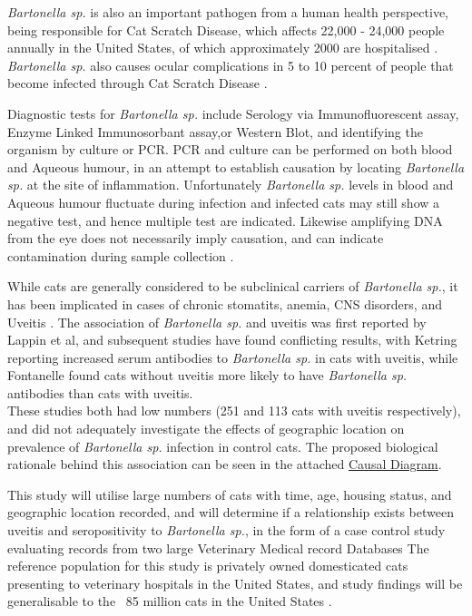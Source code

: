 \documentclass[11pt,twocolumn]{article}
\begin{document}
		\emph{Bartonella sp.} is also an important pathogen from a human health perspective, being responsible for Cat Scratch Disease, which affects 22,000 - 24,000 people annually in the United States, of which approximately 2000 are hospitalised \cite{Jackson1993}.
		\emph{Bartonella sp.} also causes ocular complications in 5 to 10 percent of people that become infected through Cat Scratch Disease \cite{Wade2000}.
	
		Diagnostic tests for \emph{Bartonella sp.} include Serology via Immunofluorescent assay, Enzyme Linked Immunosorbant assay,or Western Blot, and identifying the organism by culture or PCR.
		PCR and culture can be performed on both blood and Aqueous humour, in an attempt to establish causation by locating \emph{Bartonella sp.} at the site of inflammation. Unfortunately \emph{Bartonella sp.} levels in blood and Aqueous humour fluctuate during infection and infected cats may still show a negative test, and hence multiple test are indicated\cite{Guptill2010}. Likewise amplifying DNA from the eye does not necessarily imply causation, and can indicate contamination during sample collection \cite{Powell2010}.


		While cats are generally considered to be subclinical carriers of \emph{Bartonella sp.}, it has been implicated in cases of chronic stomatits, anemia, CNS disorders, and Uveitis \cite{Nasir2005}.
		The association of \emph{Bartonella sp.} and uveitis was first reported by Lappin et al\cite{Lappin1999}, and subsequent studies have found conflicting results, with Ketring reporting increased serum antibodies to \emph{Bartonella sp.} in cats with uveitis\cite{Ketring2004}, while Fontanelle found cats without uveitis more likely to have \emph{Bartonella sp.} antibodies than cats with uveitis.\\
		These studies both had low numbers (251 and 113 cats with uveitis respectively), and did not adequately investigate the effects of geographic location on prevalence of \emph{Bartonella sp.} infection in control cats.
		The proposed biological rationale behind this association can be seen in the attached \hyperref[fig:1]{Causal Diagram}.
	
		This study will utilise large numbers of cats with time, age, housing status, and geographic location recorded, and will determine if a relationship exists between uveitis and seropositivity to  \emph{Bartonella sp.}, in the form of a case control study evaluating records from two large Veterinary Medical record Databases \cite{bark12,UniversityVeterinary}	
		The reference population for this study is privately owned domesticated cats presenting to veterinary hospitals in the United States, and study findings will be generalisable to the ~85 million cats in the United States \cite{HSUSown}.
		
\end{document}
